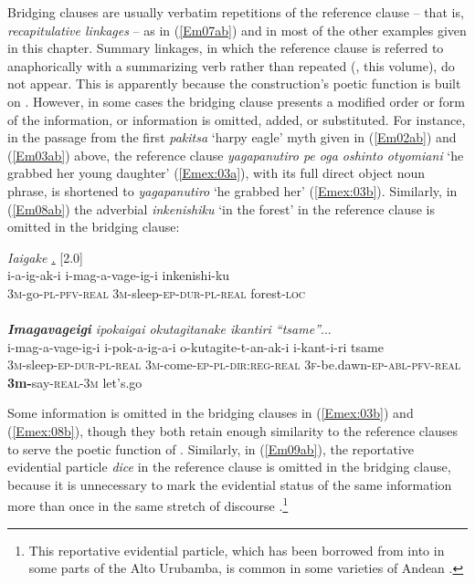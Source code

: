 \documentclass[output=paper]{LSP/langsci}
\begin{document}
 
Bridging clauses are usually verbatim repetitions of the reference clause – that is, \textit{recapitulative linkages} – as in (\ref{Em07ab}) and in most of the other examples given in this chapter. Summary linkages, in which the reference clause is referred to anaphorically with a summarizing verb rather than repeated (\citeauthor{guerin18}, this volume), do not appear. This is apparently because the construction’s poetic function is built on . However, in some cases the bridging clause presents a modified order or form of the information, or information is omitted, added, or substituted. For instance, in the passage from the first \textit{pakitsa} `harpy eagle' myth given in (\ref{Em02ab}) and (\ref{Em03ab}) above, the reference clause \textit{yagapanutiro pe oga oshinto otyomiani} `he grabbed her young daughter' (\ref{Emex:03a}), with its full direct object noun phrase, is shortened to \textit{yagapanutiro} `he grabbed her' (\ref{Emex:03b}). Similarly, in (\ref{Em08ab}) the adverbial \textit{inkenishiku} `in the forest' in the reference clause is omitted in the bridging clause:

\begin{exe}
\ex \label{Em08ab}
\begin{xlist}
\ex \label{Emex:08a}
\glt \textit{Iaigake \underline{.}} [2.0]\\
\gll i-a-ig-ak-i i-mag-a-vage-ig-i inkenishi-ku \\
 \textsc{3m-}go\textsc{-pl-pfv-real} \textsc{3m-}sleep\textsc{-ep-dur-pl-real} forest\textsc{-loc}\\
\glt {}\\
\ex \label{Emex:08b}
\glt \textit{\textbf{Imagavageigi} ipokaigai okutagitanake ikantiri ``tsame''}...\\
\gll i-mag-a-vage-ig-i i-pok-a-ig-a-i o-kutagite-t-an-ak-i i-kant-i-ri tsame\\     	      
   \textsc{3m-}sleep\textsc{-ep-dur-pl-real} \textsc{3m-}come\textsc{-ep-pl-dir:reg-real} \textsc{3f-}be.dawn\textsc{-ep-abl-pfv-real} \textbf{3m-}say\textsc{-real-3m} let’s.go\\
\glt {}
\end{xlist}
\end{exe}


%
Some information is omitted in the bridging clauses in (\ref{Emex:03b}) and (\ref{Emex:08b}), though they both retain enough similarity to the reference clauses to serve the poetic function of . Similarly, in (\ref{Em09ab}), the  reportative evidential particle \textit{dice} in the reference clause is omitted in the bridging clause, because it is unnecessary to mark the evidential status of the same information more than once in the same stretch of discourse \citep[for a similar case in , see][392]{schulze73}.\footnote{This reportative evidential particle, which has been borrowed from  into  in some parts of the {Alto Urubamba}, is common in some varieties of Andean  \citep[as well as its variant \textit{dizque}; see][]{babel.2009}.} 
\end{document}
